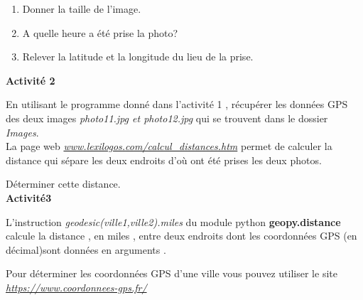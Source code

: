 \documentclass[10pt,fleqn]{article} %
\newenvironment{oldpy}[1][\hsize]%
{%
    \def\FrameCommand%
    {%
\rotatebox{90}{\texttt{[image: png/logo\_python]}}
        {\color{violetf}\vrule width 3pt}%
        \hspace{0pt}%
        \fboxsep=\FrameSep\colorbox{violetc}%
    }%
    \MakeFramed{\hsize #1 \advance\hsize-\width\FrameRestore}%
}%
{\endMakeFramed}%
\begin{document}
\begin{enumerate}
	\item Donner la taille de l'image.
	\item A quelle heure a été prise la photo?
	\item Relever la latitude et la longitude  du lieu de la prise.
\end{enumerate}

\bigskip

\textbf{Activité 2}

 En utilisant le programme donné dans l'activité 1 , récupérer les données GPS des deux images \textit{photo11.jpg et photo12.jpg} qui se trouvent dans le dossier \textit{Images}.\\

La page web \textit{\url{www.lexilogos.com/calcul\_distances.htm}} permet de calculer la distance qui sépare les deux endroits d'où ont été prises les deux photos.

\medskip


Déterminer cette distance.\\

\textbf{Activité3}

\medskip

L'instruction \textit{geodesic(ville1,ville2).miles} du module python  \textbf{geopy.distance} calcule la distance , en miles ,  entre deux endroits dont les coordonnées GPS (en décimal)sont données en arguments .

Pour déterminer les coordonnées GPS d'une ville vous pouvez utiliser le site \textit{\url{https://www.coordonnees-gps.fr/}} 
	
\end{document}
